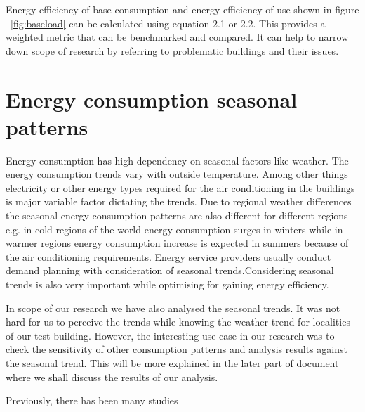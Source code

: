 Energy efficiency of base consumption and energy efficiency of use shown in figure ~\ref{fig:baseload} can be calculated using equation 2.1 or 2.2. This provides a weighted metric that can be benchmarked and compared. It can help to narrow down scope of research by referring to problematic buildings and their issues.

\section{Energy consumption seasonal patterns}
Energy consumption has high dependency on seasonal factors like weather. The energy consumption trends vary with outside temperature. Among other things electricity or other energy types required for the air conditioning in the buildings is major variable factor dictating the trends. Due to regional weather differences the seasonal energy consumption patterns are also different for different regions e.g. in cold regions of the world energy consumption surges in winters while in warmer regions energy consumption increase is expected in summers because of the air conditioning requirements. Energy service providers usually conduct demand planning with consideration of seasonal trends.Considering seasonal trends is also very important while optimising for gaining energy efficiency. 

In scope of our research we have also analysed the seasonal trends. It was not hard for us to perceive the trends while knowing the weather trend for localities of our test building. However, the interesting use case in our research was to check the sensitivity of other consumption patterns and analysis results against the seasonal trend. This will be more explained in the later part of document where we shall discuss the results of our analysis.

Previously, there has been many studies  





 


